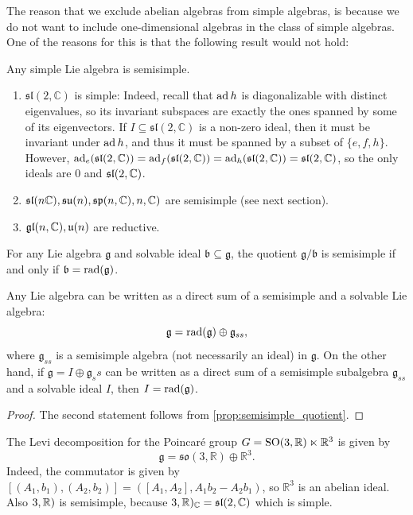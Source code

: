 \documentclass{report}
\begin{document}
The reason that we exclude abelian algebras from simple algebras, is because we do not want to include one-dimensional algebras in the class of simple algebras.
One of the reasons for this is that the following result would not hold:
\begin{proposition}
    Any simple Lie algebra is semisimple.
\end{proposition}
\begin{example}
    \begin{enumerate}[label = (\roman*)]
        \item $\mathfrak{sl}(2, \mathbb C)$ is simple:
        Indeed, recall that $\operatorname{ad} h$ is diagonalizable with distinct eigenvalues, so its invariant subspaces are exactly the ones spanned by some of its eigenvectors.
        If $I\subseteq \mathfrak{sl}(2, \mathbb C)$ is a non-zero ideal, then it must be invariant under $\operatorname{ad} h$, and thus it must be spanned by a subset of $\{e, f, h\}$.
        However, $\operatorname{ad}_e(\operatorname{{\mathfrak{sl}}}(2, \mathbb C)) = \operatorname{ad}_f(\operatorname{{\mathfrak{sl}}}(2, \mathbb C)) = \operatorname{ad}_h(\operatorname{{\mathfrak{sl}}}(2, \mathbb C)) = \operatorname{{\mathfrak{sl}}}(2, \mathbb C)$, so the only ideals are $0$ and $\operatorname{{\mathfrak{sl}}}(2, \mathbb C)$.
        \item $\mathfrak{sl}(n \mathbb C), \su(n), \mathfrak{sp}(n, \mathbb C), \so(n, \mathbb C)$ are semisimple (see next section).
        \item $\operatorname{{\mathfrak{gl}}}(n, \mathbb C), \mathfrak u(n)$ are reductive. 
    \end{enumerate}
\end{example}

\begin{proposition}\label{prop:semisimple_quotient}
    For any Lie algebra $\mathfrak g$ and solvable ideal $\mathfrak b \subseteq \mathfrak g$, the quotient $\mathfrak g/ \mathfrak b$ is semisimple if and only if $\mathfrak b = \operatorname{rad} (\mathfrak g)$.
\end{proposition}

\begin{theorem}
    Any Lie algebra can be written as a direct sum of a semisimple and a solvable Lie algebra:
    \[
    \mathfrak g = \operatorname{rad}(\mathfrak g) \oplus \mathfrak g_{ss},
    \]
    where $\mathfrak g_{ss}$ is a semisimple algebra (not necessarily an ideal) in $\mathfrak g$.
    On the other hand, if $\mathfrak g = I \oplus \mathfrak{g}_ss$ can be written as a direct sum of a semisimple subalgebra $\mathfrak g_{ss}$ and a solvable ideal $I$, then $I= \operatorname{rad}(\mathfrak g)$.
\end{theorem}
\begin{proof}
    The second statement follows from \cref{prop:semisimple_quotient}.
\end{proof}
\begin{example}
    The Levi decomposition for the Poincaré group $G = \operatorname{{\mathrm{SO}}}(3, \mathbb R) \ltimes \mathbb R^3$ is given by
    \[
    \mathfrak g = \mathfrak{so}(3, \mathbb R) \oplus \mathbb R^3.
    \]
    Indeed, the commutator is given by $[(A_1, b_1), (A_2, b_2)] = ([A_1, A_2], A_1 b_2 - A_2 b_1)$, so $\mathbb R^3$ is an abelian ideal.
    Also $\so(3, \mathbb R)$ is semisimple, because $\so(3, \mathbb R)_{\mathbb C} = \mathfrak{sl}(2, \mathbb C)$ which is simple.
\end{example}
\end{document}
